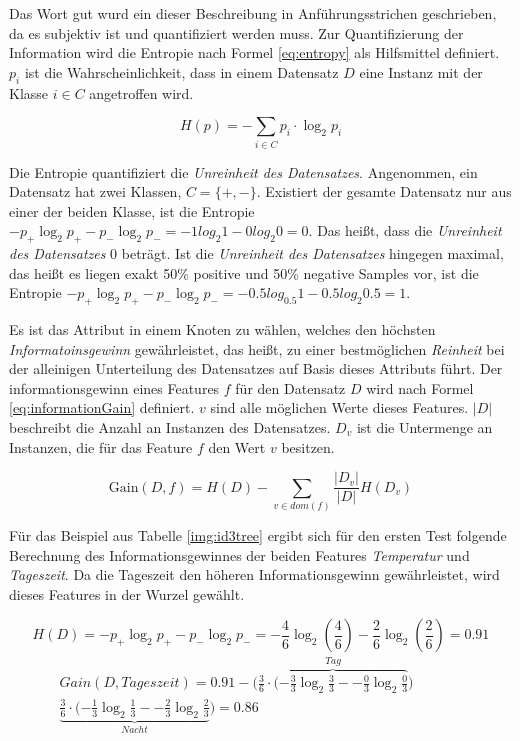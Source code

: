 Das Wort \glqq gut\grqq{} wurd ein dieser Beschreibung in Anführungsstrichen geschrieben, da es subjektiv ist und quantifiziert werden muss. Zur Quantifizierung der Information wird die Entropie nach Formel \ref{eq:entropy} als Hilfsmittel definiert. $p_i$ ist die Wahrscheinlichkeit, dass in einem Datensatz $D$ eine Instanz mit der Klasse $i \in C$ angetroffen wird.

\begin{equation}
H(p) = -\sum_{i \in C} p_i \cdot \log_{2} p_i
\label{eq:entropy}
\end{equation}

Die Entropie quantifiziert die \emph{Unreinheit des Datensatzes}. Angenommen, ein Datensatz hat zwei Klassen, $C = \{+,-\}$. Existiert der gesamte Datensatz nur aus einer der beiden Klasse, ist die Entropie $- p_{+} \log_{2} p_{+}- p_{-}  \log_{2} p_{-} = -1 log_{2} 1 -0 log_{2} 0 = 0$. Das heißt, dass die \emph{Unreinheit des Datensatzes} $0$  beträgt. Ist die \emph{Unreinheit des Datensatzes} hingegen maximal, das heißt es liegen exakt 50\% positive und 50\% negative Samples vor, ist die Entropie $- p_{+} \log_{2} p_{+} - p_{-}  \log_{2} p_{-} = -0.5 log_{0.5} 1 - 0.5 log_{2} 0.5 = 1$. \cite[S. 135]{machine_marsland}

Es ist das Attribut in einem Knoten zu wählen, welches den höchsten \emph{Informatoinsgewinn} gewährleistet, das heißt, zu einer bestmöglichen \emph{Reinheit} bei der alleinigen Unterteilung des Datensatzes auf Basis dieses Attributs führt. Der informationsgewinn eines Features $f$ für den Datensatz $D$ wird nach Formel \ref{eq:informationGain} definiert. $v$ sind alle möglichen Werte dieses Features. $|D|$ beschreibt die Anzahl an Instanzen des Datensatzes. $D_v$ ist die Untermenge an Instanzen, die für das Feature $f$ den Wert $v$ besitzen.\cite[S. 136 - 137]{machine_marsland}

\begin{equation}
\text{Gain}(D,f) = H(D) - \sum_{v \in dom(f)} \frac{|D_v|}{|D|} H(D_v)
\label{eq:informationGain}
\end{equation}

Für das Beispiel aus Tabelle \ref{img:id3tree} ergibt sich für den ersten Test folgende Berechnung des Informationsgewinnes der beiden Features \emph{Temperatur} und \emph{Tageszeit}. Da die Tageszeit den höheren Informationsgewinn gewährleistet, wird dieses Features in der Wurzel gewählt. 

\begin{equation}
H(D) = - p_{+} \log_{2} p_{+} - p_{-}  \log_{2} p_{-} = -\frac{4}{6} \log_{2} (\frac{4}{6}) -\frac{2}{6} \log_{2}( \frac{2}{6} ) = 0.91
\end{equation}
\begin{equation}
\begin{split}
Gain(D,Tageszeit) = 0.91 - \Big( \overbrace{\frac{3}{6} \cdot (-\frac{3}{3} \log_{2} \frac{3}{3} -  -\frac{0}{3} \log_{2} \frac{0}{3} }^{Tag}   )\ \quad \quad \quad \; \\
\underbrace{\frac{3}{6} \cdot (-\frac{1}{3} \log_{2} \frac{1}{3} -  -\frac{2}{3} \log_{2} \frac{2}{3} }_{Nacht}   \Big)  = 0.86
\end{split}
\end{equation}

